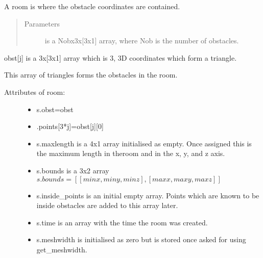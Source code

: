 \documentclass[letterpaper,10pt,english]{sphinxmanual}
\begin{document}
\begin{fulllineitems}
\label{\detokenize{index:Room.room}}
A room is where the obstacle co\sphinxhyphen{}ordinates are contained.
\begin{quote}\begin{description}
\item[{Parameters}] \leavevmode
{} \textendash{} is a Nobx3x{[}3x1{]} array, where Nob is the number of     obstacles.

\end{description}\end{quote}

obst{[}j{]} is a 3x{[}3x1{]} array which is 3, 3D co\sphinxhyphen{}ordinates   which form a triangle.

This array of triangles forms the obstacles in the room.
\begin{description}
\item[{Attributes of room:}] \leavevmode\begin{itemize}
\item {} 
s.obst=obst

\item {} 
.points{[}3*j{]}=obst{[}j{]}{[}0{]}

\item {} 
s.maxlength is a 4x1 array initialised as empty. Once assigned     this is the maximum length in theroom and in the x, y, and z axis.

\item {} 
s.bounds is a 3x2 array     \(s.bounds= [ [minx, miny, minz], [maxx,maxy,maxz]]\)

\item {} 
s.inside\_points is an initial empty array. Points which are known     to be inside obstacles are added to this array later.

\item {} 
s.time is an array with the time the room was created.

\item {} 
s.meshwidth is initialised as zero but is stored once asked for     using get\_meshwidth.

\end{itemize}

\end{description}


\end{fulllineitems}
\end{document}
